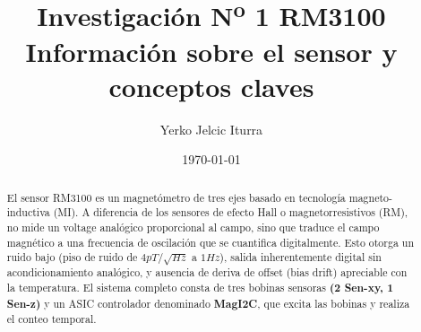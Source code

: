 \documentclass[11pt,letterpaper]{article}
\title{
    Investigación N\textsuperscript{o} 1 RM3100 \\
    \large Información sobre el sensor y conceptos claves
}
\author{Yerko Jelcic Iturra}
\date{\today}
\begin{document}
\maketitle

\begin{abstract}
    El sensor RM3100 es un magnetómetro de tres ejes basado en tecnología magneto-inductiva (MI). A diferencia de los sensores de efecto Hall o magnetorresistivos (RM), no mide un voltage analógico proporcional al campo, sino que traduce el campo magnético a una frecuencia de oscilación que se cuantifica digitalmente. Esto otorga un ruido bajo (piso de ruido de $4pT/\sqrt{Hz}$ a $1Hz$), salida inherentemente digital sin acondicionamiento analógico, y ausencia de deriva de offset (bias drift) apreciable con la temperatura. El sistema completo consta de tres bobinas sensoras \textbf{(2 Sen-xy, 1 Sen-z)} y un ASIC controlador denominado \textbf{MagI2C}, que excita las bobinas y realiza el conteo temporal.
\end{abstract}
\end{document}
